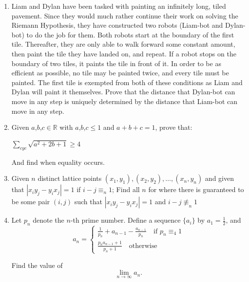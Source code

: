 \documentclass{article}
\begin{document}
\begin{enumerate}
\medskip
\item %
Liam and Dylan have been tasked with painting an infinitely long, tiled pavement. Since they would much rather continue their work on solving the Riemann Hypothesis, they have constructed two robots (Liam-bot and Dylan-bot) to do the job for them. Both robots start at the boundary of the first tile. Thereafter, they are only able to walk forward some constant amount, then paint the tile they have landed on, and repeat. If a robot stops on the boundary of two tiles, it paints the tile in front of it. In order to be as efficient as possible, no tile may be painted twice, and every tile must be painted. The first tile is exempted from both of these conditions as Liam and Dylan will paint it themselves. Prove that the distance that Dylan-bot can move in any step is uniquely determined by the distance that Liam-bot can move in any step.

\medskip
\item %

Given $a$,$b$,$c\in\mathbb{R}$ with $a$,$b$,$c\leq 1$ and $a+b+c = 1$, prove that:
\begin{center}
   $\sum_{cyc} \sqrt{a^2+2b+1}\geq 4$ 
\end{center}
And find when equality occurs.

\medskip
\item %
Given $n$ distinct lattice points $(x_1,y_1),(x_2,y_2),\ldots,(x_n,y_n)$ and given that $|x_iy_{j}-y_ix_{j}| = 1$ if $i-j\equiv_n 1$;
Find all $n$ for where there is guaranteed to be some pair $(i,j)$ such that $|x_iy_{j}-y_ix_{j}| = 1$ and $i-j\not\equiv_n 1$

\medskip
\item %
Let $p_n$ denote the $n$-th prime number. Define a sequence $\{a_i\}$ by $a_1 = \frac{1}{2}$, and
$$
a_n = 
\begin{cases}
	\frac{1}{p_n} + a_{n - 1} - \frac{a_{n - 1}}{p_n} \quad \text{if } p_n \equiv _4 1 \\
	\frac{p_na_{n - 1} + 1}{p_n + 1} \quad \text{otherwise}
\end{cases}
$$

Find the value of 
$$\lim_{n \to \infty} a_n.$$

\end{enumerate}
\end{document}

